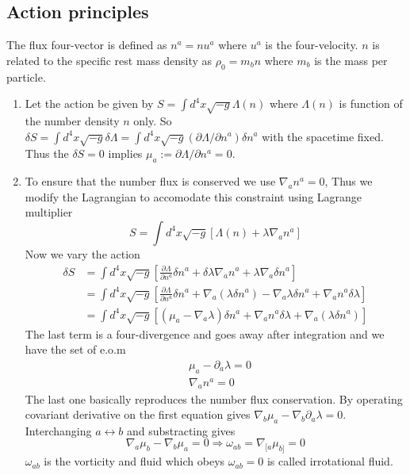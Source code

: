 \documentclass[10pt]{article}
\begin{document}
\subsection{Action principles}
\label{sec:action-principles}
The flux four-vector is defined as $n^a = n u^a$ where $u^a$ is the four-velocity. $n$ is related to the specific rest mass density as $\rho_0 = m_b n$ where $m_b$ is the mass per particle.
\begin{enumerate}
\item Let the action be given by $S = \int d^4x\sqrt{-g} \Lambda (n)$ where $\Lambda(n)$ is function of the number density $n$ only. So $\delta S = \int d^4x\sqrt{-g}\delta \Lambda = \int d^4x \sqrt{-g} (\partial \Lambda/\partial n^a)\delta n^a$ with the spacetime fixed. Thus the $\delta S = 0$ implies $\boxed{\mu_a := \partial \Lambda/\partial n^a = 0}$.

\item To ensure that the number flux is conserved we use $\nabla_a n^a = 0$, Thus we modify the Lagrangian to accomodate this constraint using Lagrange multiplier
  \begin{equation}
    \label{eq:Lagrangian-with-Lagrange-multiplier}
    S = \int d^4x \sqrt{-g}\left[\Lambda(n) + \lambda \nabla_a n^a\right]
  \end{equation}
  Now we vary the action
  \begin{align}
    \label{eq:vary-action-Lagrange-multiplier}
    \delta S
    & = \int d^4x \sqrt{-g}\left[\frac{\partial \Lambda}{\partial n^a}\delta n^a + \delta \lambda \nabla_a n^a + \lambda \nabla_a \delta n^a\right]\\
    & = \int d^4 x\sqrt{-g} \left[\frac{\partial \Lambda}{\partial n^a}\delta n^a + \nabla_a(\lambda \delta n^a) - \nabla_a \lambda \delta n^a + \nabla_a n^a\delta \lambda\right]\\
    & = \int d^4x \sqrt{-g} \left[\left(\mu_a - \nabla_a\lambda\right)\delta n^a + \nabla_a n^a \delta \lambda + \nabla_a(\lambda \delta n^a)\right]
  \end{align}
  The last term is a four-divergence and  goes away after integration and we have the set of e.o.m
  \begin{equation}
    \label{eq:set-of-eom}
    \begin{aligned}
      & \mu_a - \partial_a \lambda = 0\\
      & \nabla_a n^a = 0
    \end{aligned}
  \end{equation}
  The last one basically reproduces the number flux conservation. By operating covariant derivative on the first equation gives $\nabla_b \mu_a - \nabla_b\partial_a\lambda = 0$. Interchanging $a\leftrightarrow b$ and substracting gives
  \begin{equation}
    \label{eq:irrotationality}
    \nabla_a\mu_b - \nabla_b \mu_a = 0 \Rightarrow \boxed{\omega_{ab} = \nabla_{[a}\mu_{b]} = 0}
  \end{equation}
  $\omega_{ab}$ is the vorticity and fluid which obeys $\omega_{ab} = 0$ is called irrotational fluid.


\end{enumerate}
\end{document}
